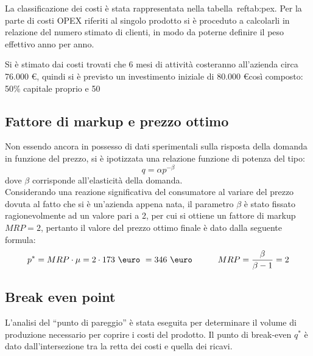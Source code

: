 La classificazione dei costi è stata rappresentata nella tabella~ref{tab:pex}.
Per la parte di costi OPEX riferiti al singolo prodotto si è proceduto a
calcolarli in relazione del numero stimato di clienti, in modo da poterne
definire il peso effettivo anno per anno.


Si è stimato dai costi trovati che 6 mesi di attività costeranno all’azienda
circa 76.000 \euro, quindi si è previsto un investimento iniziale di 80.000 \euro così
composto: 50\% capitale proprio e 50%
\subsection{Fattore di markup e prezzo ottimo}
Non essendo ancora in possesso di dati sperimentali sulla risposta della domanda
in funzione del prezzo, si è ipotizzata una relazione funzione di potenza del
tipo: 
\begin{displaymath}
q = \alpha p^{-\beta}
\end{displaymath}
dove $\beta$ corrisponde all’elasticità della domanda.\\
Considerando una reazione significativa del consumatore al variare del prezzo
dovuta al fatto che si è un’azienda appena nata, il parametro $\beta$ è stato
fissato ragionevolmente ad un valore pari a 2, per cui si ottiene un fattore di
markup $MRP=2$, pertanto il valore del prezzo ottimo finale è dato dalla
seguente formula:
\begin{displaymath}
	p^* = MRP \cdot \mu =  2 \cdot 173 \ \mbox{\euro} \ = 346 \ \mbox{\euro}
\qquad\quad    MRP = \frac{\beta}{\beta-1} = 2
\end{displaymath}
\subsection{Break even point}
L’analisi del “punto di pareggio” è stata eseguita per determinare il volume di
produzione necessario per coprire i costi del prodotto.  Il punto di break-even
$q^*$ è dato dall’intersezione tra la retta dei costi e quella dei ricavi. 

